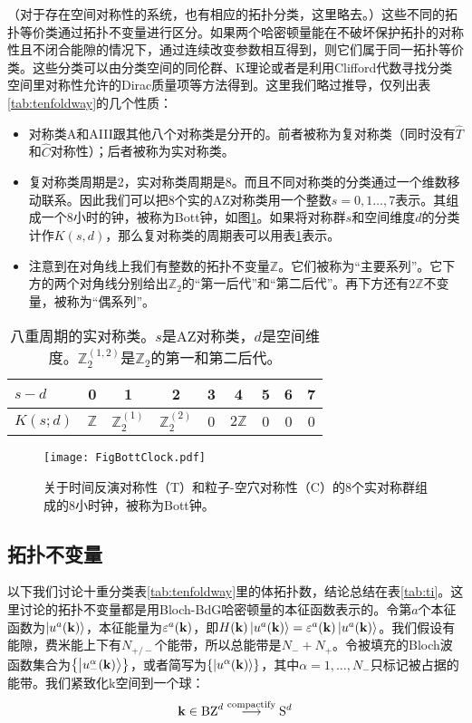 （对于存在空间对称性的系统，也有相应的拓扑分类，这里略去。）这些不同的拓扑等价类通过拓扑不变量进行区分。如果两个哈密顿量能在不破坏保护拓扑的对称性且不闭合能隙的情况下，通过连续改变参数相互得到，则它们属于同一拓扑等价类。这些分类可以由分类空间的同伦群、K理论\cite{Kitaev2009}或者是利用Clifford代数寻找分类空间里对称性允许的Dirac质量项等方法得到。这里我们略过推导，仅列出表\ref{tab:tenfoldway}的几个性质：
\begin{itemize}
    \item 对称类A和AIII跟其他八个对称类是分开的。前者被称为复对称类（同时没有$\hat T$和$\hat C$对称性）；后者被称为实对称类。
    \item 复对称类周期是2，实对称类周期是8。而且不同对称类的分类通过一个维数移动联系。因此我们可以把8个实的AZ对称类用一个整数$s=0,1\dots,7$表示。其组成一个8小时的钟，被称为Bott钟，如图\ref{bottclock}。如果将对称群$s$和空间维度$d$的分类计作$K(s,d)$，那么复对称类的周期表可以用表\ref{eightfoldway}表示。
    \item 注意到在对角线上我们有整数的拓扑不变量$\mathbb Z$。它们被称为“主要系列”。它下方的两个对角线分别给出$\mathbb Z_2$的“第一后代”和“第二后代”。再下方还有$2\mathbb Z$不变量，被称为“偶系列”。
\end{itemize}

\begin{table}[hb]
    \centering
    \caption{八重周期的实对称类。$s$是AZ对称类，$d$是空间维度。$\mathbb Z^{(1,2)}_2$是$\mathbb Z_2$的第一和第二后代。}
    \label{eightfoldway}
    \begin{tabular}{l|cccccccc}
    \toprule
    $s-d$ & 0 & 1 & 2 & 3 & 4 & 5 & 6 & 7\\
    \midrule
    $K(s;d)$ & $\mathbb Z$ & $\mathbb Z_2^{(1)}$ & $\mathbb Z_2^{(2)}$ & 0 & $2\mathbb Z$ & 0 & 0 & 0\\
    \bottomrule
    \end{tabular}
\end{table}

\begin{figure}[ht!]
    \centering
    \texttt{[image: FigBottClock.pdf]}
    \caption{关于时间反演对称性（T）和粒子-空穴对称性（C）的8个实对称群组成的8小时钟，被称为Bott钟。}
    \label{bottclock}
\end{figure}

\subsection{拓扑不变量}

以下我们讨论十重分类表\ref{tab:tenfoldway}里的体拓扑数，结论总结在表\ref{tab:ti}。这里讨论的拓扑不变量都是用Bloch-BdG哈密顿量的本征函数表示的。令第$a$个本征函数为$\ket{u^a(\vb k)}$，本征能量为$\varepsilon^a(\vb k)$，即$H(\vb k)\ket{u^a(\vb k)}=\varepsilon^a(\vb k) \ket{u^a(\vb k)}$。我们假设有能隙，费米能上下有$N_{+/-}$个能带，所以总能带是$N_-+N_+$。令被填充的Bloch波函数集合为$\Bqty{\ket{u_-^\alpha(\vb k)}}$，或者简写为$\Bqty{\ket{u^\alpha(\vb k)}}$，其中$\alpha=1,\dots,N_-$只标记被占据的能带。我们紧致化k空间到一个球：
\begin{equation}
  \vb k\in \text{BZ}^d\overset{\text{compactify}}{\longrightarrow}\mathrm{S}^d
\end{equation}
